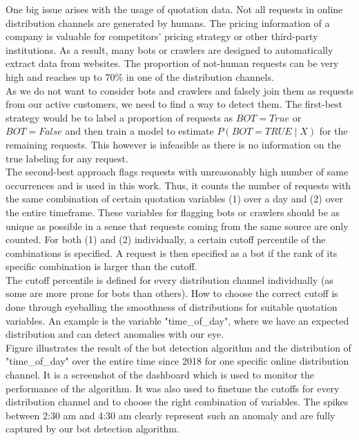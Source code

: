 \documentclass[12pt,titlepage]{article}
\begin{document}
One big issue arises with the usage of quotation data. Not all requests in online distribution channels are generated by humans. The pricing information of a company is valuable for competitors' pricing strategy or other third-party institutions. As a result, many bots or crawlers are designed to automatically extract data from websites. The proportion of not-human requests can be very high and reaches up to 70\% in one of the distribution channels. \\
As we do not want to consider bots and crawlers and falsely join them as requests from our active customers, we need to find a way to detect them. The first-best strategy would be to label a proportion of requests as $BOT=True$ or $BOT=False$ and then train a model to estimate $P(BOT=TRUE \mid X)$ for the remaining requests. This however is infeasible as there is no information on the true labeling for any request. \\
The second-best approach flags requests with unreasonably high number of same occurrences and is used in this work. Thus, it counts the number of requests with the same combination of certain quotation variables (1) over a day and (2) over the entire timeframe. These variables for flagging bots or crawlers should be as unique as possible in a sense that requests coming from the same source are only counted. For both (1) and (2) individually, a certain cutoff percentile of the combinations is specified. A request is then specified as a bot if the rank of its specific combination is larger than the cutoff. \\
The cutoff percentile is defined for every distribution channel individually (as some are more prone for bots than others). How to choose the correct cutoff is done through eyeballing the smoothness of distributions for suitable quotation variables. An example is the variable "time\_of\_day", where we have an expected distribution and can detect anomalies with our eye. \\
Figure \label{fig:bots} illustrates the result of the bot detection algorithm and the distribution of "time\_of\_day" over the entire time since 2018 for one specific online distribution channel. It is a screenshot of the dashboard which is used to monitor the performance of the algorithm. It was also used to finetune the cutoffs for every distribution channel and to choose the right combination of variables. The spikes between 2:30 am and 4:30 am clearly represent such an anomaly and are fully captured by our bot detection algorithm. \\
\end{document}
